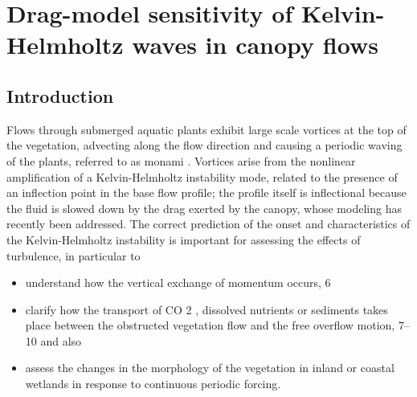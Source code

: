 \chapter{Drag-model sensitivity of Kelvin-Helmholtz waves in canopy flows}

\section{Introduction}

Flows through submerged aquatic plants exhibit large scale vortices at the top of the vegetation,
advecting along the flow direction and causing a periodic waving of the plants, referred to as
monami \cite{ackerman1993reduced}.  Vortices arise from the nonlinear amplification of a Kelvin-Helmholtz instability mode,
related to the presence of an inflection point in the base flow profile; \cite{asaeda2005morphological} the profile itself is inflectional
because the fluid is slowed down by the drag exerted by the canopy, whose modeling has recently
been addressed. \cite{py2004mixing} \cite{singh2016linear}  \cite{zampogna2016instability} The correct prediction of the onset and characteristics of the Kelvin-Helmholtz
instability is important for assessing the effects of turbulence, in particular to
\begin{itemize}
	\item  understand how the vertical exchange of momentum occurs, 6
	\item clarify how the transport of CO 2 , dissolved nutrients or sediments takes place between the
	obstructed vegetation flow and the free overflow motion, 7–10 and also
	\item assess the changes in the morphology of the vegetation in inland or coastal wetlands in
	response to continuous periodic forcing. \cite{asaeda2005morphological} \cite{patil2010characteristics}
\end{itemize}

